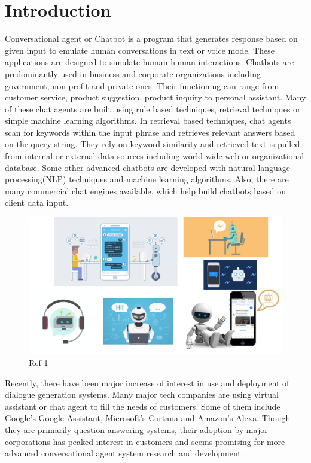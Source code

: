 \documentclass[a4paper,12pt]{report}
\begin{document}
\chapter {Introduction}
Conversational agent or Chatbot is a program that generates response based on given input to emulate human conversations in text or voice mode. These applications are designed to simulate human-human interactions. Chatbots are predominantly used in business and corporate organizations including government, non-profit and private ones. Their functioning can range from customer service, product suggestion, product inquiry to personal assistant. Many of these chat agents are built using rule based techniques, retrieval techniques or simple machine learning algorithms. In retrieval based techniques, chat agents scan for keywords within the input phrase and retrieves relevant answers based on the query string. They rely on keyword similarity and retrieved text is pulled from internal or external data sources including world wide web or organizational database. Some other advanced chatbots are developed with natural language processing(NLP) techniques and machine learning algorithms. Also, there are many commercial chat engines available, which help build chatbots based on client data input. 
\begin{figure}[H]
\begin{center}
\includegraphics[scale=.5]{face}
\caption{Ref 1}
\end{center}
\end{figure}
\noindent Recently, there have been major increase of interest in use and deployment of dialogue generation systems. Many major tech companies are using virtual assistant or chat agent to fill the needs of customers. Some of them include Google's Google Assistant, Microsoft's Cortana and Amazon's Alexa. Though they are primarily question answering systems, their adoption by major corporations has peaked interest in customers and seems promising for more advanced conversational agent system research and development.\\
\end{document}
